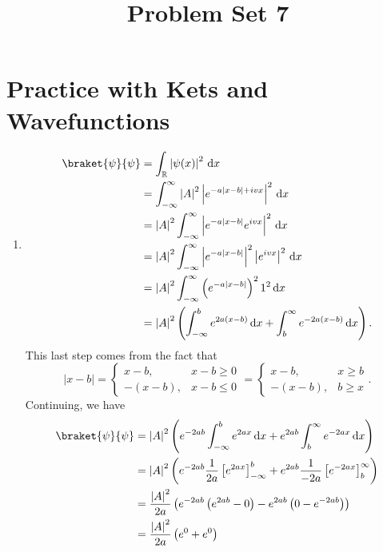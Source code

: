 \documentclass[11pt, letterpaper]{article}
\title{Problem Set 7}
\begin{document}
\makeproblem
\section{Practice with Kets and Wavefunctions}
\begin{enumerate}
	\item 
		\begin{align*}
			\braket{\psi }{\psi } &=\int_{\mathbb{R} } \left| \psi (x) \right| ^2 \,\mathrm{d} x\\
					      &=\int_{-\infty }^{\infty } \left| A \right| ^2 \left| e^{-a|x-b|+ivx}  \right| ^2 \,\mathrm{d} x\\
					      &=\left| A \right| ^2\int_{-\infty }^{\infty } \left| e^{-a\left| x-b \right| } e^{ivx}  \right| ^2 \,\mathrm{d} x\\
					      &=\left| A \right| ^2\int_{-\infty }^{\infty } \left| e^{-a|x-b|}  \right| ^2\left| e^{ivx}  \right| ^2 \,\mathrm{d} x\\
					      &=\left| A \right| ^2\int_{-\infty }^{\infty } \left( e^{-a|x-b|}  \right) ^21^2 \,\mathrm{d} x\\
					      &=\left| A \right| ^2\left( \int_{-\infty }^{b} e^{2a(x-b)}  \,\mathrm{d} x+\int_{b }^{\infty } e^{-2a(x-b)}  \,\mathrm{d} x \right) 
		.\end{align*}
		This last step comes from the fact that
		\[
			\left| x-b \right| =
			\begin{cases}
				x-b,&x-b\geq 0\\
				-(x-b),&x-b\leq 0
			\end{cases}
			=
			\begin{cases}
				x-b,&x\geq b\\
				-(x-b),&b\geq x
			\end{cases}
		.\]
		Continuing, we have
		\begin{align*}
			\braket{\psi }{\psi } &=\left| A \right| ^2\left( e^{-2ab} \int_{-\infty }^{b} e^{2ax}  \,\mathrm{d} x +e^{2ab} \int_{b}^{\infty } e^{-2ax}  \,\mathrm{d} x\right) \\
					      &=\left| A \right| ^2\left( e^{-2ab} \frac{1}{2a} \left[ e^{2ax}  \right]_{-\infty }^b+e^{2ab} \frac{1}{-2a} \left[ e^{-2ax}  \right]_b^{\infty }  \right) \\
					      &=\frac{\left| A \right| ^2}{2a} \left(e^{-2ab}  \left( e^{2ab} -0 \right) -e^{2ab} \left( 0-e^{-2ab} \right)  \right) \\
					      &=\frac{\left| A \right| ^2}{2a} \left( e^{0} +e^{0}  \right) \\

\end{align*}
\end{enumerate}
\end{document}
